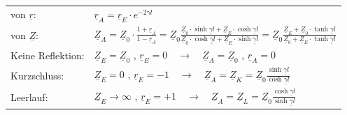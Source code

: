 \begin{tabular}{| p{6cm} | l |}
				 \\	
				\hfill von $\underline{r}$: & $\underline{r}_{A}= \underline{r}_{E}\cdot e^{-2\gamma l}$\\
				\hfill von $\underline{Z}$:	& $\underline{Z}_A = \underline{Z}_0 \cdot \frac{1+\underline{r}_A}{1-\underline{r}_A} = \underline{Z}_0
				\frac{\underline{Z}_0 \cdot \sinh \underline{\gamma}l +\underline{Z}_E \cdot \cosh\underline{\gamma}l} {\underline{Z}_0 \cdot \cosh \underline{\gamma}l+\underline{Z}_E \cdot \sinh\underline{\gamma}l} = 				\underline{Z}_0
				\frac{\underline{Z}_E+\underline{Z}_0 \cdot \tanh\underline{\gamma}l}{\underline{Z}_0+\underline{Z}_E \cdot \tanh\underline{\gamma}l}
				$\\
			\cline{2-2}			
				\hfill Keine Reflektion:
				& $\underline{Z}_{E}=\underline{Z}_0$ , $\underline{r}_E = 0 \quad \rightarrow \quad \underline{Z}_{A}=\underline{Z}_0$ ,  $\underline{r}_A = 0$\\
				\hfill Kurzschluss:
				& $ \underline{Z}_{E} = 0$ , $\underline{r}_E = -1 \quad \rightarrow \quad \underline{Z}_{A} = \underline{Z}_{K} = \underline{Z}_0 \frac{\sinh \underline{\gamma}l}{\cosh \underline{\gamma}l}$
					\\
				\hfill Leerlauf:
				&$ \underline{Z}_{E} \rightarrow \infty$ , $\underline{r}_E = +1 \quad \rightarrow \quad \underline{Z}_{A} = \underline{Z}_{L} = \underline{Z}_0 \frac{\cosh \underline{\gamma}l}{\sinh \underline{\gamma}l}$\\
			\hline  
			 
		\end{tabular}
	\renewcommand{\arraystretch}{1}
	

